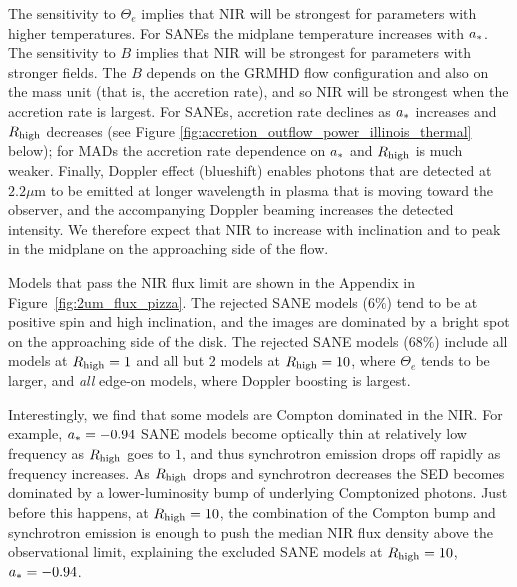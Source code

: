The sensitivity to $\Theta_e$ implies that NIR will be strongest for parameters with higher temperatures.  For SANEs the midplane temperature increases with $a_*$.
The sensitivity to $B$ implies that NIR will be strongest for parameters with stronger fields.  The $B$ depends on the GRMHD flow configuration and also on the mass unit (that is, the accretion rate), and so NIR will be strongest when the accretion rate is largest.  For SANEs, accretion rate declines as $a_*$ increases and $R_\mathrm{high}$ decreases (see Figure \ref{fig:accretion_outflow_power_illinois_thermal} below); for MADs the accretion rate dependence on $a_*$ and $R_\mathrm{high}$ is much weaker.
Finally, Doppler effect (blueshift) enables photons that are detected at $2.2\mu$m to be emitted at longer wavelength in plasma that is moving toward the observer, and the accompanying Doppler beaming increases the detected intensity.  We therefore expect that NIR to increase with inclination and to peak in the midplane on the approaching side of the flow.

Models that pass the NIR flux limit are shown in the Appendix in Figure~\ref{fig:2um_flux_pizza}. The rejected SANE models ($6\%$) tend to be at positive spin and high inclination, and the images are dominated by a bright spot on the approaching side of the disk.
The rejected SANE models ($68\%$) include all models at $R_\mathrm{high} = 1$ and all but 2 models at $R_\mathrm{high} = 10$, where $\Theta_e$ tends to be larger, and {\em all} edge-on models, where Doppler boosting is largest.

Interestingly, we find that some models are Compton dominated in the NIR.  For example, $a_* = -0.94$ SANE models become optically thin at relatively low frequency as $R_\mathrm{high}$ goes to $1$, and thus synchrotron emission drops off rapidly as frequency increases.
As $R_\mathrm{high}$ drops and synchrotron decreases the SED becomes dominated by a lower-luminosity bump of underlying Comptonized photons.  Just before this happens, at $R_\mathrm{high} = 10$, the combination of the Compton bump and synchrotron emission is enough to push the median NIR flux density above the observational limit, explaining the excluded SANE models at $R_\mathrm{high} = 10$, $a_* = -0.94$.



